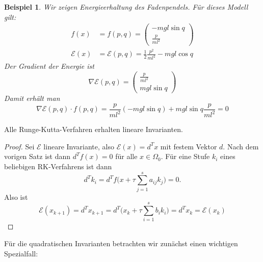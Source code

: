 \documentclass[german]{scrreprt}
\theoremstyle{plain}
\theoremstyle{nonumberplain}
\theoremstyle{nonumberplain}
\newtheorem{bsp}{Beispiel}
\theoremstyle{nonumberplain}
\newtheorem{proof}{Beweis}
\begin{document}
\begin{bsp}
	Wir zeigen Energieerhaltung des Fadenpendels.
	Für dieses Modell gilt:
	\begin{align*}
	f(x) & = f(p,q)
	=
	\begin{pmatrix}
	- mgl \sin q \\ \frac{p}{ml^2}
	\end{pmatrix} \\
	\mathcal{E}(x) & = \mathcal{E}(p,q)
	=
	\frac{1}{2} \frac{p^2}{ml^2} - mgl \cos q
	\end{align*}
	Der Gradient der Energie ist
	\begin{equation*}
	\nabla \mathcal{E}(p,q) =
	\begin{pmatrix}
	\frac{p}{ml^2} \\ mgl \sin q
	\end{pmatrix}
	\end{equation*}
	Damit erhält man
	\begin{equation*}
	\nabla \mathcal{E}(p,q) \cdot f(p,q)
	= \frac{p}{ml^2}(- mgl \sin q) + mgl \sin q\frac{p}{ml^2}
	= 0
	\end{equation*}
\end{bsp}


\begin{satz}
	Alle Runge-Kutta-Verfahren erhalten lineare Invarianten.
\end{satz}
\begin{proof}%
	Sei $\mathcal{E}$ lineare Invariante, also $\mathcal{E}(x) = d^Tx$ mit festem Vektor $d$.
	Nach dem vorigen Satz ist dann $d^T f(x) = 0$ für alle $x\in\Omega_0$.
	Für eine Stufe $k_i$ eines beliebigen RK-Verfahrens ist dann
	\begin{equation*}
	d^T k_i = d^T f\Big( x+\tau\sum_{j=1}^s a_{ij}k_j \Big) = 0.
	\end{equation*}
	Also ist
	\begin{equation*}
	\mathcal E(x_{k+1})
	= d^T x_{k+1}
	= d^T\Big(x_k+\tau\sum_{i=1}^s b_{i}k_i\Big)
	= d^T x_k
	= \mathcal{E}(x_k)
	\end{equation*}
\end{proof}

Für die quadratischen Invarianten betrachten wir zunächst einen wichtigen Spezialfall:
\end{document}
